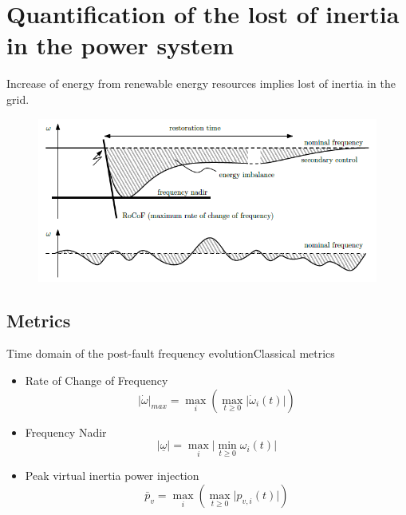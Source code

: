\documentclass[aspectratio=169, 12pt]{beamer}
\begin{document}
\section{Quantification of the lost of inertia in the power system}
\begin{frame}{\insertsection}
  Increase of energy from renewable energy resources implies lost of inertia in the grid.
  \begin{figure}
    \centering
    \includegraphics[width=0.5\columnwidth]{figure/frequency_disturbance.png}
  \end{figure} 
\end{frame}

\subsection{Metrics}
\begin{frame}{Time domain of the post-fault frequency evolution}{Classical metrics}
  \begin{itemize}[<+(1)->]
    \item Rate of Change of Frequency
    \begin{equation}
      \lvert \dot{\omega} \rvert _{max} = \max_i\left(\max_{t\ge0}\lvert \dot{\omega}_i(t) \rvert\right)
    \end{equation}
    
    \item Frequency Nadir
    \begin{equation}
      \lvert \underline{\omega} \rvert = \max_i\lvert\min_{t\ge0} \omega_i(t) \rvert
    \end{equation}
    \item Peak virtual inertia power injection
    \begin{equation}
      \bar{p}_v = \max_i\left(\max_{t\ge0}\lvert p_{v,i}(t) \rvert\right)
    \end{equation}
  \end{itemize}
\end{frame}
\end{document}
